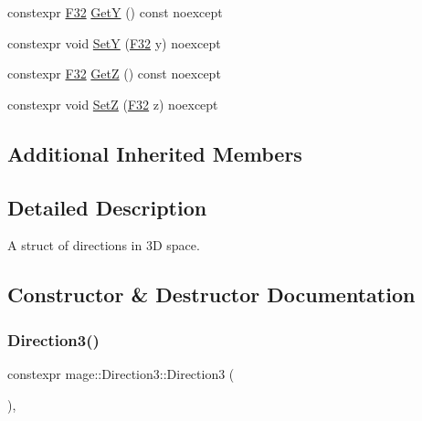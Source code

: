 \begin{DoxyCompactItemize}
\item 
constexpr \mbox{\hyperlink{namespacemage_aa97e833b45f06d60a0a9c4fc22ae02c0}{F32}} \mbox{\hyperlink{structmage_1_1_direction3_a995bc58846a268b63f6e7fdd678420cd}{GetY}} () const noexcept
\item 
constexpr void \mbox{\hyperlink{structmage_1_1_direction3_a4ac25624a33e1eee6724f0b411737d2c}{SetY}} (\mbox{\hyperlink{namespacemage_aa97e833b45f06d60a0a9c4fc22ae02c0}{F32}} y) noexcept
\item 
constexpr \mbox{\hyperlink{namespacemage_aa97e833b45f06d60a0a9c4fc22ae02c0}{F32}} \mbox{\hyperlink{structmage_1_1_direction3_a6ee9bc60c92c37c6ff7e1b432bf191c7}{GetZ}} () const noexcept
\item 
constexpr void \mbox{\hyperlink{structmage_1_1_direction3_a26d3ef84f5c7429f325871c5d59e39e7}{SetZ}} (\mbox{\hyperlink{namespacemage_aa97e833b45f06d60a0a9c4fc22ae02c0}{F32}} z) noexcept
\end{DoxyCompactItemize}
\subsection*{Additional Inherited Members}


\subsection{Detailed Description}
A struct of directions in 3D space. 

\subsection{Constructor \& Destructor Documentation}
\mbox{\label{structmage_1_1_direction3_a64dd4745147f5fd39f710e8b9591074a}} 
\subsubsection{\texorpdfstring{Direction3()}{Direction3()}\hspace{0.1cm}{\footnotesize\ttfamily [1/5]}}
{\footnotesize\ttfamily constexpr mage\+::\+Direction3\+::\+Direction3 (\begin{DoxyParamCaption}{ }\end{DoxyParamCaption})\hspace{0.3cm}{\ttfamily [default]}, {\ttfamily [noexcept]}}

